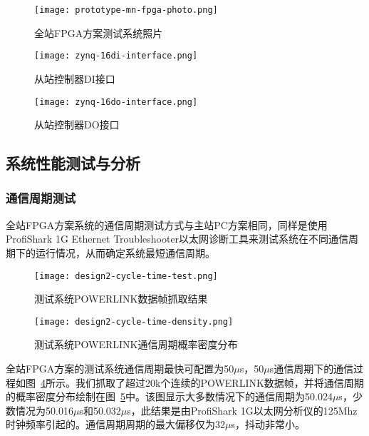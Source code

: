 \begin{figure}[htbp]
  \centering
  \texttt{[image: prototype-mn-fpga-photo.png]}
  \caption{全站FPGA方案测试系统照片}
  \label{fig:prototype-mn-fpga-photo}
\end{figure}

\begin{figure}[htbp]
  \centering
  \texttt{[image: zynq-16di-interface.png]}
  \caption{从站控制器DI接口}
  \label{fig:zynq-16di-interface}
\end{figure}

\begin{figure}[htbp]
  \centering
  \texttt{[image: zynq-16do-interface.png]}
  \caption{从站控制器DO接口}
  \label{fig:zynq-16do-interface}
\end{figure}

\subsection{系统性能测试与分析}
\label{subsection:系统性能测试与分析}

\subsubsection{通信周期测试}
\label{subsection:系统通信周期测试}
全站FPGA方案系统的通信周期测试方式与主站PC方案相同，同样是使用ProfiShark 1G Ethernet Troubleshooter以太网诊断工具来测试系统在不同通信周期下的运行情况，从而确定系统最短通信周期。

\begin{figure}[!htb]
  \centering
  \texttt{[image: design2-cycle-time-test.png]}
  \caption{测试系统POWERLINK数据帧抓取结果}
  \label{fig:design2-cycle-time-test}
\end{figure}

\begin{figure}[!htb]
  \centering
  \texttt{[image: design2-cycle-time-density.png]}
  \caption{测试系统POWERLINK通信周期概率密度分布}
  \label{fig:design2-cycle-time-density}
\end{figure}

全站FPGA方案的测试系统通信周期最快可配置为50$\mu$s，50$\mu$s通信周期下的通信过程如图~\ref{fig:design2-cycle-time-test}所示。我们抓取了超过20k个连续的POWERLINK数据帧，并将通信周期的概率密度分布绘制在图~\ref{fig:design2-cycle-time-density}中。该图显示大多数情况下的通信周期为50.024$\mu$s，少数情况为50.016$\mu$s和50.032$\mu$s，此结果是由ProfiShark 1G以太网分析仪的125Mhz时钟频率引起的。通信周期周期的最大偏移仅为32$\mu$s，抖动非常小。

